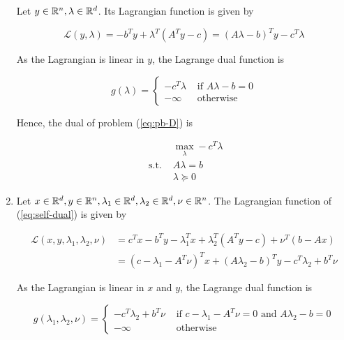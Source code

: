\documentclass[a4paper, 11pt]{report}
\begin{document}
\begin{enumerate}
    Let $y \in \mathbb{R}^{n}, \lambda \in \mathbb{R}^{d}$. Its Lagrangian function is given by
    
    \[ \mathcal{L} \left( y, \lambda \right) = - b^{T} y + \lambda^{T} \left( A^{T} y - c \right) = \left( A \lambda - b \right)^{T} y - c^{T} \lambda \]

    As the Lagrangian is linear in $y$, the Lagrange dual function is
    
    \begin{equation*}
        g \left( \lambda \right) = \begin{cases}
        - c^{T} \lambda & \text{ if } A \lambda - b = 0 \\
        - \infty & \text{ otherwise }
        \end{cases}
    \end{equation*}
    
    Hence, the dual of problem (\ref{eq:pb-D}) is
    
    \begin{equation*}
        \boxed{\begin{aligned}
        & \max_{\lambda} 
        - c^{T} \lambda \\
        \text{ s.t. }
        & A \lambda = b \\
        & \lambda \succeq 0
        \end{aligned}}
    \end{equation*}

    \item Let $x \in \mathbb{R}^{d}, y \in \mathbb{R}^{n}, \lambda_{1} \in \mathbb{R}^{d}, \lambda_{2} \in \mathbb{R}^{d}, \nu \in \mathbb{R}^{n}$. The Lagrangian function of (\ref{eq:self-dual}) is given by
    
    \begin{equation*}
        \begin{aligned}
        \mathcal{L} \left( x, y, \lambda_{1}, \lambda_{2}, \nu \right) &= c^{T} x - b^{T} y - \lambda_{1}^{T} x + \lambda_{2}^{T} \left( A^{T} y - c \right) + \nu^{T} \left( b - Ax \right) \\
        &= \left( c - \lambda_{1} - A^{T} \nu \right)^{T} x + \left( A \lambda_{2} - b \right)^{T} y - c^{T} \lambda_{2} + b^{T} \nu
        \end{aligned}
    \end{equation*}
    
    As the Lagrangian is linear in $x$ and $y$, the Lagrange dual function is
    
    \begin{equation*}
        g \left( \lambda_{1}, \lambda_{2}, \nu \right) = \begin{cases}
        - c^{T} \lambda_{2} + b^{T} \nu & \text{ if } c - \lambda_{1} - A^{T} \nu = 0 \text{ and } A \lambda_{2} - b = 0 \\
        - \infty & \text{ otherwise }
        \end{cases}
    \end{equation*}
    

\end{enumerate}
\end{document}

